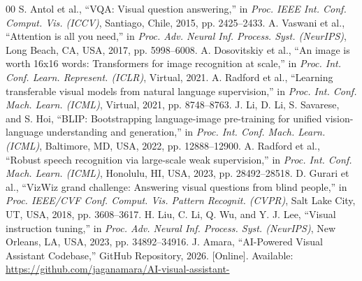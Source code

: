 \documentclass[conference]{IEEEtran}
\begin{document}
\begin{thebibliography}{00}
 S. Antol et al., ``VQA: Visual question answering,'' in \textit{Proc. IEEE Int. Conf. Comput. Vis. (ICCV)}, Santiago, Chile, 2015, pp. 2425--2433.
 A. Vaswani et al., ``Attention is all you need,'' in \textit{Proc. Adv. Neural Inf. Process. Syst. (NeurIPS)}, Long Beach, CA, USA, 2017, pp. 5998--6008.
 A. Dosovitskiy et al., ``An image is worth 16x16 words: Transformers for image recognition at scale,'' in \textit{Proc. Int. Conf. Learn. Represent. (ICLR)}, Virtual, 2021.
 A. Radford et al., ``Learning transferable visual models from natural language supervision,'' in \textit{Proc. Int. Conf. Mach. Learn. (ICML)}, Virtual, 2021, pp. 8748--8763.
 J. Li, D. Li, S. Savarese, and S. Hoi, ``BLIP: Bootstrapping language-image pre-training for unified vision-language understanding and generation,'' in \textit{Proc. Int. Conf. Mach. Learn. (ICML)}, Baltimore, MD, USA, 2022, pp. 12888--12900.
 A. Radford et al., ``Robust speech recognition via large-scale weak supervision,'' in \textit{Proc. Int. Conf. Mach. Learn. (ICML)}, Honolulu, HI, USA, 2023, pp. 28492--28518.
 D. Gurari et al., ``VizWiz grand challenge: Answering visual questions from blind people,'' in \textit{Proc. IEEE/CVF Conf. Comput. Vis. Pattern Recognit. (CVPR)}, Salt Lake City, UT, USA, 2018, pp. 3608--3617.
 H. Liu, C. Li, Q. Wu, and Y. J. Lee, ``Visual instruction tuning,'' in \textit{Proc. Adv. Neural Inf. Process. Syst. (NeurIPS)}, New Orleans, LA, USA, 2023, pp. 34892--34916.
 J. Amara, ``AI-Powered Visual Assistant Codebase,'' GitHub Repository, 2026. [Online]. Available: \url{https://github.com/jaganamara/AI-visual-assistant-}
\end{thebibliography}
\end{document}
